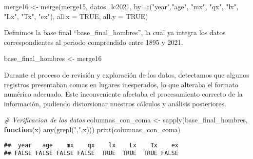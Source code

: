 \documentclass[
]{article}
\newenvironment{Shaded}{\begin{snugshade}}{\end{snugshade}}
\newcommand{\AttributeTok}[1]{\textcolor[rgb]{0.77,0.63,0.00}{#1}}
\newcommand{\CommentTok}[1]{\textcolor[rgb]{0.56,0.35,0.01}{\textit{#1}}}
\newcommand{\ConstantTok}[1]{\textcolor[rgb]{0.00,0.00,0.00}{#1}}
\newcommand{\ControlFlowTok}[1]{\textcolor[rgb]{0.13,0.29,0.53}{\textbf{#1}}}
\newcommand{\FunctionTok}[1]{\textcolor[rgb]{0.00,0.00,0.00}{#1}}
\newcommand{\NormalTok}[1]{#1}
\newcommand{\OtherTok}[1]{\textcolor[rgb]{0.56,0.35,0.01}{#1}}
\newcommand{\StringTok}[1]{\textcolor[rgb]{0.31,0.60,0.02}{#1}}
\begin{document}
\begin{Shaded}
\begin{Highlighting}[]
\NormalTok{merge16 }\OtherTok{\textless{}{-}} \FunctionTok{merge}\NormalTok{(merge15, datos\_lc2021, }\AttributeTok{by=}\FunctionTok{c}\NormalTok{(}\StringTok{"year"}\NormalTok{,}\StringTok{"age"}\NormalTok{, }\StringTok{"mx"}\NormalTok{, }\StringTok{"qx"}\NormalTok{, }\StringTok{"lx"}\NormalTok{, }\StringTok{"Lx"}\NormalTok{, }\StringTok{"Tx"}\NormalTok{, }\StringTok{"ex"}\NormalTok{), }\AttributeTok{all.x =} \ConstantTok{TRUE}\NormalTok{, }\AttributeTok{all.y =} \ConstantTok{TRUE}\NormalTok{)}
\end{Highlighting}
\end{Shaded}

Definimos la base final ``base\_final\_hombres'', la cual ya integra los
datos correspondientes al periodo comprendido entre 1895 y 2021.

\begin{Shaded}
\begin{Highlighting}[]
\NormalTok{base\_final\_hombres }\OtherTok{\textless{}{-}}\NormalTok{ merge16}
\end{Highlighting}
\end{Shaded}

Durante el proceso de revisión y exploración de los datos, detectamos
que algunos registros presentaban comas en lugares inesperados, lo que
alteraba el formato numérico adecuado. Este inconveniente afectaba el
procesamiento correcto de la información, pudiendo distorsionar nuestros
cálculos y análisis posteriores.

\begin{Shaded}
\begin{Highlighting}[]
\CommentTok{\# Verificacion de los datos }
\NormalTok{columnas\_con\_coma }\OtherTok{\textless{}{-}} \FunctionTok{sapply}\NormalTok{(base\_final\_hombres, }\ControlFlowTok{function}\NormalTok{(x) }\FunctionTok{any}\NormalTok{(}\FunctionTok{grepl}\NormalTok{(}\StringTok{","}\NormalTok{,x)))}
\FunctionTok{print}\NormalTok{(columnas\_con\_coma)}
\end{Highlighting}
\end{Shaded}

\begin{verbatim}
##  year   age    mx    qx    lx    Lx    Tx    ex 
## FALSE FALSE FALSE FALSE  TRUE  TRUE  TRUE FALSE
\end{verbatim}
\end{document}
